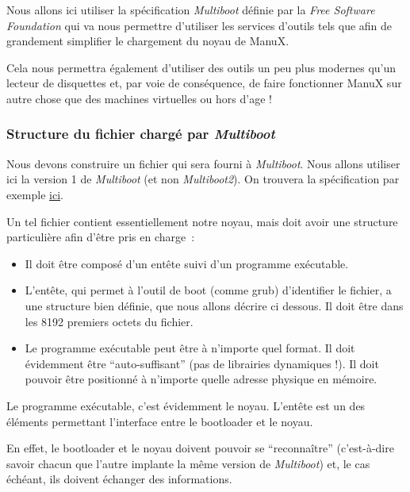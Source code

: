    Nous allons ici utiliser la spécification {\em Multiboot} définie
par la {\em Free Software Foundation} qui va nous permettre d'utiliser
les services d'outils tels que \grub afin de grandement simplifier
le chargement du noyau de ManuX.

   Cela nous permettra également d'utiliser des outils un peu plus
modernes qu'un lecteur de disquettes et, par voie de conséquence, de
faire fonctionner ManuX sur autre chose que des machines virtuelles ou
hors d'age !

%
\subsubsection{Structure du fichier chargé par {\em Multiboot}}

   Nous devons construire un fichier qui sera fourni à {\em
Multiboot}.  Nous allons utiliser ici la version 1 de {\em Multiboot} (et
non {\em Multiboot2}). On trouvera la spécification par exemple
\href{https://www.gnu.org/software/grub/manual/multiboot/multiboot.html}{ici}.

   Un tel fichier contient essentiellement notre noyau, mais doit avoir
une structure particulière afin d'être pris en charge~:

\begin{itemize}
   \item Il doit être composé d'un entête suivi d'un programme
     exécutable.
   \item L'entête, qui permet à l'outil de boot (comme {\sc grub})
     d'identifier le fichier, a une structure bien définie, que nous
     allons décrire ci dessous. Il doit être dans les 8192 premiers
     octets du fichier.
   \item Le programme exécutable peut être à n'importe quel format. Il
     doit évidemment être ``auto-suffisant'' (pas de librairies
     dynamiques !). Il doit pouvoir être positionné à n'importe quelle
     adresse physique en mémoire. 
\end{itemize}

   Le programme exécutable, c'est évidemment le noyau. L'entête est un
des éléments permettant l'interface entre le bootloader et le noyau.

   En effet, le bootloader et le noyau doivent pouvoir se
``reconnaître'' (c'est-à-dire savoir chacun que l'autre implante la
même version de {\em Multiboot}) et, le cas échéant, ils doivent
échanger des informations.

